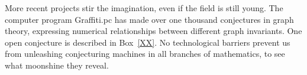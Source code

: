 \documentclass{llncs}
\begin{document}
%

More recent projects stir the imagination, even if the field
is still young.
The computer program  Graffiti.pc has made over one thousand
 conjectures in graph theory, expressing numerical relationships
between different graph invariants.
One open conjecture is described in Box~\ref{XX}.
No technological barriers prevent us from unleashing conjecturing
machines in all branches of mathematics,
to see what  moonshine they reveal.
\end{document}
